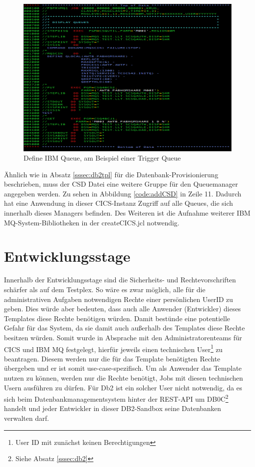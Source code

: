 \begin{figure}[h]
	\centering
	\includegraphics[width=\textwidth]{figures/defqjcl.PNG}
	\caption{Define IBM Queue, am Beispiel einer Trigger Queue}
	\label{code:defq}
\end{figure}

Ähnlich wie in Absatz \ref{sssec:db2tpl} für die Datenbank-Provisionierung beschrieben, muss der CSD Datei eine weitere Gruppe für den Queuemanager angegeben werden.
Zu sehen in Abbildung \ref{code:addCSD} in Zeile 11.
Dadurch hat eine Anwendung in dieser CICS-Instanz Zugriff auf alle Queues, die sich innerhalb dieses Managers befinden.
Des Weiteren ist die Aufnahme weiterer IBM MQ-System-Bibliotheken in der \glqq createCICS.jcl\grqq{} notwendig.

\section{Entwicklungsstage}
Innerhalb der Entwicklungsstage sind die Sicherheits- und Rechtevorschriften schärfer als auf dem Testplex.
So wäre es zwar möglich, alle für die administrativen Aufgaben notwendigen Rechte einer persönlichen UserID zu geben.
Dies würde aber bedeuten, dass auch alle Anwender (Entwickler) dieses Templates diese Rechte benötigen würden.
Damit bestünde eine potentielle Gefahr für das System, da sie damit auch außerhalb des Templates diese Rechte besitzen würden.
Somit wurde in Absprache mit den Administratorenteams für CICS und IBM MQ festgelegt, hierfür jeweils einen technischen User\footnote{User ID mit zunächst keinen Berechtigungen} zu beantragen.
Diesem werden nur die für das Template benötigten Rechte übergeben und er ist somit use-case-spezifisch.
Um als Anwender das Template nutzen zu können, werden nur die Rechte benötigt, Jobs mit diesen technischen Usern ausführen zu dürfen.
Für Db2 ist ein solcher User nicht notwendig, da es sich beim Datenbankmanagementsystem hinter der REST-API um DB0C\footnote{Siehe Absatz \ref{sssec:db2}} handelt und jeder Entwickler in dieser \glqq DB2-Sandbox\grqq{} seine Datenbanken verwalten darf. 

